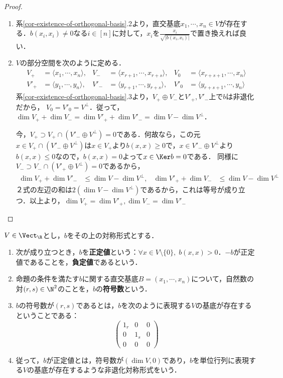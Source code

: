 \documentclass[uplatex, dvipdfmx]{jsreport}
\begin{document}
\begin{proof}\mbox{}
    \begin{enumerate}
        \item 系\ref{cor-existence-of-orthogonal-basis}.2より，直交基底$x_1,\cdots,x_n\in V$が存在する．$b(x_i,x_i)\ne 0$なる$i\in[n]$に対して，$x_i$を$\frac{x_i}{\sqrt{|b(x_i,x_i)|}}$で置き換えれば良い．
        \item $V$の部分空間を次のように定める．\begin{align*}
            V_+&=\langle x_1,\cdots,x_n\rangle,&V_-&=\langle x_{r+1},\cdots,x_{r+s}\rangle,&V_0&=\langle x_{r+s+1},\cdots,x_n\rangle\\
            V'_+&=\langle y_1,\cdots,y_n\rangle,&V'_-&=\langle y_{r+1},\cdots,y_{r+s}\rangle,&V'_0&=\langle y_{r+s+1},\cdots,y_n\rangle
        \end{align*}
        系\ref{cor-existence-of-orthogonal-basis}.3より，$V_+\oplus V_-$と$V'_+,V'_-$上で$b$は非退化だから，
        $V_0=V'_0=V^\perp$．従って，$\dim V_++\dim V_-=\dim V'_++\dim V'_-=\dim V-\dim V^\perp$．
        
        今，$V_+\supset V_+\cap(V'_-\oplus V^\perp)=0$である．何故なら，この元$x\in V_+\cap(V'_-\oplus V^\perp)$は$x\in V_+$より$b(x,x)\ge 0$で，$x\in V'_-\oplus V^\perp$より$b(x,x)\le 0$なので，$b(x,x)=0$よって$x\in\Ker b=0$である．
        同様に$V_-\supset V_-\cap(V'_+\oplus V^\perp)=0$であるから，
        \begin{align*}
            \dim V_++\dim V'_-&\le\dim V-\dim V^\perp,&\dim V'_++\dim V_-&\le\dim V-\dim V^\perp
        \end{align*}
        ２式の左辺の和は$2(\dim V-\dim V^\perp)$であるから，これは等号が成り立つ．以上より，$\dim V_+=\dim V'_+,\dim V_-=\dim V'_-$
    \end{enumerate}
\end{proof}

\begin{definition}
    $V\in\Vect_\R$とし，$b$をその上の対称形式とする．
    \begin{enumerate}
        \item 次が成り立つとき，$b$を\textbf{正定値}という：$\forall x\in V\setminus\{0\},\;b(x,x)>0$．$-b$が正定値であることを，\textbf{負定値}であるという．
        \item 命題の条件を満たす$b$に関する直交基底$B=(x_1,\cdots,x_n)$について，自然数の対$(r,s)\in\N^2$のことを，$b$の\textbf{符号数}という．
        \item $b$の符号数が$(r,s)$であるとは，$b$を次のように表現する$V$の基底が存在するということである：\[\begin{pmatrix}1_r&0&0\\0&1_s&0\\0&0&0\end{pmatrix}\]
        \item 従って，$b$が正定値とは，符号数が$(\dim V,0)$であり，$b$を単位行列に表現する$V$の基底が存在するような非退化対称形式をいう．
    \end{enumerate}
\end{definition}
\end{document}
